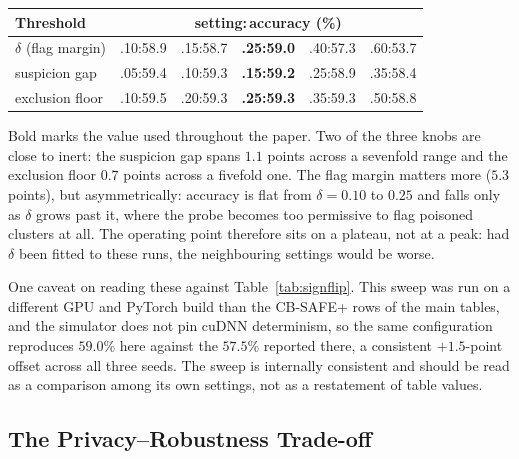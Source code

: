 \documentclass[lettersize,journal]{IEEEtran}
\begin{document}
\begin{center}\scriptsize\setlength{\tabcolsep}{3pt}
\begin{tabular}{@{}lccccc@{}}\toprule
Threshold & \multicolumn{5}{c}{setting:\,accuracy (\%)}\\\midrule
$\delta$ (flag margin) & .10:58.9 & .15:58.7 & \textbf{.25:59.0} & .40:57.3 & .60:53.7\\
suspicion gap & .05:59.4 & .10:59.3 & \textbf{.15:59.2} & .25:58.9 & .35:58.4\\
exclusion floor & .10:59.5 & .20:59.3 & \textbf{.25:59.3} & .35:59.3 & .50:58.8\\
\bottomrule\end{tabular}
\end{center}

\noindent Bold marks the value used throughout the paper. Two of the three knobs are
close to inert: the suspicion gap spans $1.1$ points across a sevenfold range and the
exclusion floor $0.7$ points across a fivefold one. The flag margin matters more
($5.3$ points), but asymmetrically: accuracy is flat from $\delta{=}0.10$ to
$0.25$ and falls only as $\delta$ grows past it, where the probe becomes too
permissive to flag poisoned clusters at all. The operating point therefore sits on a
plateau, not at a peak: had $\delta$ been fitted to these runs, the neighbouring
settings would be worse.

One caveat on reading these against Table~\ref{tab:signflip}. This sweep was run on a
different GPU and PyTorch build than the CB-SAFE+ rows of the main tables, and the
simulator does not pin cuDNN determinism, so the same configuration reproduces
$59.0\%$ here against the $57.5\%$ reported there, a consistent $+1.5$-point offset
across all three seeds. The sweep is internally consistent and should be read as a
comparison among its own settings, not as a restatement of table values.

\subsection{The Privacy--Robustness Trade-off}
\end{document}
